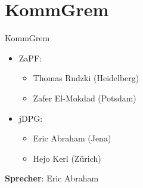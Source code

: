 \documentclass[compress,]{beamer}
\begin{document}
\section{KommGrem}

\begin{frame}{KommGrem}
	\begin{itemize}
		\item[] ZaPF:
			\begin{itemize}
				\item Thomas Rudzki (Heidelberg)
				\item Zafer El-Mokdad (Potsdam)
			\end{itemize}
		\item[] jDPG:
			\begin{itemize}
				\item Eric Abraham (Jena)
				\item Hejo Kerl (Zürich)
			\end{itemize}
	\end{itemize}
	\vspace{0.5cm}
	\textbf{Sprecher}: Eric Abraham
\end{frame}
\end{document}
